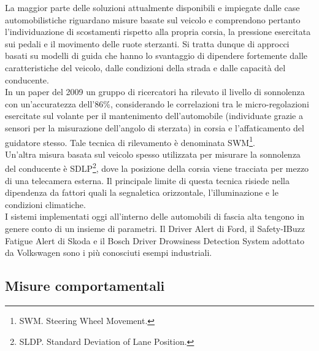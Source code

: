 \documentclass[12pt]{article}
\begin{document}
La maggior parte delle soluzioni attualmente disponibili e impiegate dalle case automobilistiche riguardano misure basate sul veicolo e comprendono pertanto l'individuazione di scostamenti rispetto alla propria corsia, la pressione esercitata sui pedali e il movimento delle ruote sterzanti. Si tratta dunque di approcci basati su modelli di guida che hanno lo svantaggio di dipendere fortemente dalle caratteristiche del veicolo, dalle condizioni della strada e dalle capacità del conducente.\\
In un paper del 2009\cite{SWM} un gruppo di ricercatori ha rilevato il livello di sonnolenza con un'accuratezza dell'86\%, considerando le correlazioni tra le micro-regolazioni esercitate sul volante per il mantenimento dell'automobile (individuate grazie a sensori per la misurazione dell'angolo di sterzata) in corsia e l'affaticamento del guidatore stesso. Tale tecnica di rilevamento è denominata SWM\footnote{SWM. Steering Wheel Movement.}.\\
Un'altra misura basata sul veicolo spesso utilizzata per misurare la sonnolenza del conducente è SDLP\footnote{SLDP. Standard Deviation of Lane Position.}, dove la posizione della corsia viene tracciata per mezzo di una telecamera esterna. Il principale limite di questa tecnica risiede nella dipendenza da fattori quali la segnaletica orizzontale, l'illuminazione e le condizioni climatiche.\\
I sistemi implementati oggi all'interno delle automobili di fascia alta tengono in genere conto di un insieme di parametri. Il Driver Alert di Ford\cite{Ford}, il Safety-IBuzz Fatigue Alert di Skoda\cite{Skoda} e il Bosch Driver Drowsiness Detection System\cite{Bosch} adottato da Volkswagen sono i più conosciuti esempi industriali.

\subsection{Misure comportamentali}
\end{document}
